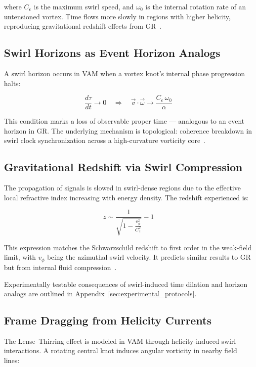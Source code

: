 \documentclass[preprint]{revtex4-2}
\begin{document}
    where \( C_e \) is the maximum swirl speed, and \( \omega_0 \) is the internal rotation rate of an untensioned vortex. Time flows more slowly in regions with higher helicity, reproducing gravitational redshift effects from GR~\cite{volovik2003universe}.

    \subsection{Swirl Horizons as Event Horizon Analogs}
    A swirl horizon occurs in VAM when a vortex knot’s internal phase progression halts:

    \[
        \frac{d\tau}{dt} \rightarrow 0 \quad \Rightarrow \quad \vec{v} \cdot \vec{\omega} \rightarrow \frac{C_e \, \omega_0}{\alpha}
    \]

    This condition marks a loss of observable proper time — analogous to an event horizon in GR. The underlying mechanism is topological: coherence breakdown in swirl clock synchronization across a high-curvature vorticity core~\cite{ranada1992knots}.

    \subsection{Gravitational Redshift via Swirl Compression}
    The propagation of signals is slowed in swirl-dense regions due to the effective local refractive index increasing with energy density. The redshift experienced is:

    \begin{equation}
        z \sim \frac{1}{\sqrt{1 - \frac{v_\phi^2}{C_e^2}}} - 1
    \end{equation}

    This expression matches the Schwarzschild redshift to first order in the weak-field limit, with \( v_\phi \) being the azimuthal swirl velocity. It predicts similar results to GR but from internal fluid compression~\cite{volovik2003universe, kleckner2013creation}.

    Experimentally testable consequences of swirl-induced time dilation and horizon analogs are outlined in Appendix~\ref{sec:experimental_protocols}.

    \subsection{Frame Dragging from Helicity Currents}
    The Lense--Thirring effect is modeled in VAM through helicity-induced swirl interactions. A rotating central knot induces angular vorticity in nearby field lines:
\end{document}
